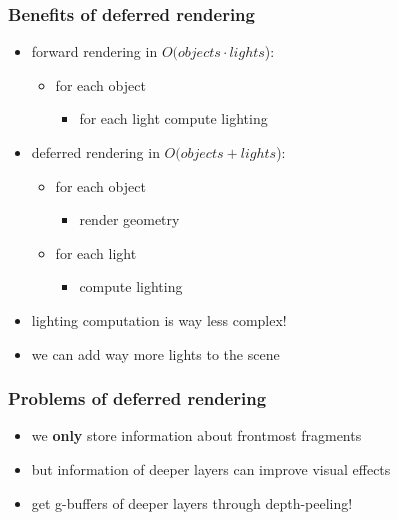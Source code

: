 \documentclass[aspectratio=169]{beamer}
\begin{document}
	\begin{frame}
		\frametitle{Benefits of deferred rendering}
		\begin{itemize}
			\item forward rendering in $O(objects \cdot lights$):
				\begin{itemize}
					\item for each object
						\begin{itemize}
							\item for each light compute lighting
						\end{itemize}
				\end{itemize}
			\item deferred rendering in $O(objects + lights$):
				\begin{itemize}
					\item for each object
						\begin{itemize}
							\item render geometry
						\end{itemize}
					\item for each light
						\begin{itemize}
							\item compute lighting
						\end{itemize}
				\end{itemize}
			\item lighting computation is way less complex!
			\item we can add way more lights to the scene
		\end{itemize}
	\end{frame}	

	\begin{frame}
		\frametitle{Problems of deferred rendering}
		\begin{itemize}
			\item we \textbf{only} store information about frontmost fragments
			\item but information of deeper layers can improve visual effects
			\item get g-buffers of deeper layers through depth-peeling!
		\end{itemize}
	\end{frame}	
\end{document}

